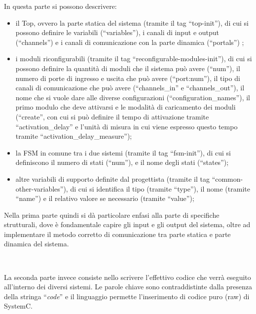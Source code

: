 \documentclass[a4paper,titlepage]{book}
\begin{document}
In questa parte si possono descrivere: 
\begin{itemize}

\item il Top, ovvero la parte statica del sistema (tramite il tag ``top-init''), di cui si possono definire le variabili (``variables''), i canali di input e output (``channels'') e i canali di comunicazione con la parte dinamica (``portals'') ;

\item i moduli riconfigurabili (tramite il tag ``reconfigurable-modules-init''), di cui si possono definire la quantità di moduli che il sistema può avere (``num''), il numero di porte di ingresso e uscita che può avere (``port:num''), il tipo di canali di comunicazione che può avere (``channels\_in'' e ``channels\_out''), il nome che si vuole dare alle diverse configurazioni (``configuration\_names''), il primo modulo che deve attivarsi e le modalità di caricamento dei moduli (``create'', con cui si può definire il tempo di attivazione tramite ``activation\_delay'' e l'unità di misura in cui viene espresso questo tempo tramite ``activation\_delay\_measure'');

\item la FSM in comune tra i due sistemi (tramite il tag ``fsm-init''), di cui si definiscono il numero di stati (``num''), e il nome degli stati (``states'');

\item altre variabili di supporto definite dal progettista (tramite il tag ``common-other-variables''), di cui si identifica il tipo (tramite ``type''),  il nome (tramite ``name'') e il relativo valore se necessario (tramite ``value'');

\end{itemize}

Nella prima parte quindi si dà particolare enfasi alla parte di specifiche strutturali, dove è fondamentale capire gli input e gli output del sistema, oltre ad implementare il metodo corretto di comunicazione tra parte statica e parte dinamica del sistema.

~ 

La seconda parte invece consiste nello scrivere l'effettivo codice che verrà eseguito all'interno dei diversi sistemi. Le parole chiave sono contraddistinte dalla presenza della stringa ``\textit{code}'' e il linguaggio permette l'inserimento di codice puro (raw) di SystemC.
\end{document}
